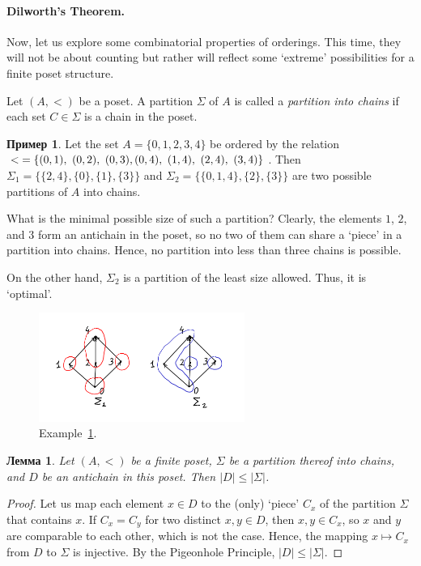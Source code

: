 \documentclass[12pt,notitlepage]{article}
\theoremstyle{plain}
\newtheorem{lemma}[thm]{Лемма}
\theoremstyle{definition}
\newtheorem{exm}[thm]{Пример}
\theoremstyle{plain}
\newcommand{\1}{\mathbf{1}}
\newcommand{\0}{\mathbf{0}}
\begin{document}
\paragraph{Dilworth's Theorem.} Now, let us explore some combinatorial properties of orderings. This time, they will not be about counting but rather will reflect some `extreme' possibilities for a finite poset structure.

Let $(A, <)$ be a poset. A partition $\Sigma$ of $A$ is called a \emph{partition into chains} if each set $C \in \Sigma$ is a chain in the poset.

\begin{exm}\label{dilworth_exm}
	Let the set $A = \{0, 1, 2, 3, 4\}$ be ordered by the relation ${<} = \{(0, 1),\ (0, 2),\ (0, 3),\linebreak (0, 4),\ (1,4),\ (2, 4),\ (3, 4)\}$. Then $\Sigma_1 = \{ \{2, 4\}, \{0\}, \{1\}, \{3\} \}$ and $\Sigma_2 = \{ \{0, 1 , 4\}, \{2\}, \{3\} \}$ are two possible partitions of $A$ into chains.
	
	What is the minimal possible size of such a partition? Clearly, the elements $1$, $2$, and $3$ form an antichain in the poset, so no two of them can share a `piece' in a partition into chains. Hence, no partition into less than three chains is possible.
	
	On the other hand, $\Sigma_2$ is a partition of the least size allowed. Thus, it is `optimal'.
\end{exm}

\begin{figure}[h]
	\centering
	\includegraphics*[width=0.6\textwidth]{dilworth_exm.pdf}
	\caption{Example~\ref{dilworth_exm}.}
\end{figure}


\begin{lemma}\label{L13:dilw_triv}
	Let $(A, <)$ be a finite poset, $\Sigma$ be a partition thereof into chains, and $D$ be an antichain in this poset. Then $|D| \leq |\Sigma|$.
\end{lemma}
\begin{proof}
	Let us map each element $x \in D$ to the (only) `piece' $C_x$ of the partition $\Sigma$ that contains $x$. If $C_x = C_y$ for two distinct $x, y \in D$, then $x, y \in C_x$, so $x$ and $y$ are comparable to each other, which is not the case. Hence, the mapping $x \mapsto C_x$ from $D$ to $\Sigma$ is injective. By the Pigeonhole Principle, $|D| \leq |\Sigma|$.
\end{proof}
\end{document}
